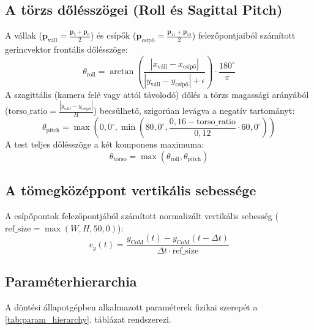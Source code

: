 \documentclass[12pt,a4paper,oneside]{report}
\begin{document}
\subsection{A törzs dőlésszögei (Roll és Sagittal Pitch)}
A vállak ($\mathbf{p}_{\text{váll}} = \frac{\mathbf{p}_5 + \mathbf{p}_6}{2}$) és csípők ($\mathbf{p}_{\text{csípő}} = \frac{\mathbf{p}_{11} + \mathbf{p}_{12}}{2}$) felezőpontjaiból számított gerincvektor frontális dőlésszöge:
\begin{equation}
    \theta_{\text{roll}} = \arctan\left( \frac{|x_{\text{váll}} - x_{\text{csípő}}|}{|y_{\text{váll}} - y_{\text{csípő}}| + \epsilon} \right) \cdot \frac{180^\circ}{\pi}
\end{equation}
A szagittális (kamera felé vagy attól távolodó) dőlés a törzs magassági arányából ($\text{torso\_ratio} = \frac{|y_{\text{váll}} - y_{\text{csípő}}|}{H}$) becsülhető, szigorúan levágva a negatív tartományt:
\begin{equation}
    \theta_{\text{pitch}} = \max\left( 0{,}0^\circ, \min\left( 80{,}0^\circ, \frac{0{,}16 - \text{torso\_ratio}}{0{,}12} \cdot 60{,}0^\circ \right) \right)
\end{equation}
A test teljes dőlésszöge a két komponens maximuma:
\begin{equation}
    \theta_{\text{torso}} = \max(\theta_{\text{roll}}, \theta_{\text{pitch}})
\end{equation}

\subsection{A tömegközéppont vertikális sebessége}
A csípőpontok felezőpontjából számított normalizált vertikális sebesség ($\text{ref\_size} = \max(W, H, 50{,}0)$):
\begin{equation}
    v_y(t) = \frac{y_{\text{CoM}}(t) - y_{\text{CoM}}(t - \Delta t)}{\Delta t \cdot \text{ref\_size}}
\end{equation}

\subsection{Paraméterhierarchia}
A döntési állapotgépben alkalmazott paraméterek fizikai szerepét a \ref{tab:param_hierarchy}. táblázat rendszerezi.
\end{document}
